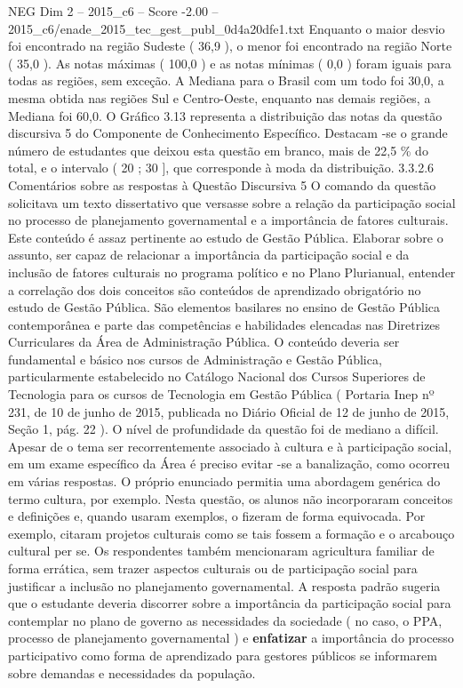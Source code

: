 \begin{textsample}{NEG Dim 2 – 2015\_c6 – Score -2.00 – 2015\_c6/enade\_2015\_tec\_gest\_publ\_0d4a20dfe1.txt}
Enquanto o maior desvio foi encontrado na região Sudeste ( 36,9 ), o menor foi encontrado na região Norte ( 35,0 ).
As notas máximas ( 100,0 ) e as notas mínimas ( 0,0 ) foram iguais para todas as regiões, sem exceção.
A Mediana para o Brasil com um todo foi 30,0, a mesma obtida nas regiões Sul e Centro-Oeste, enquanto nas demais regiões, a Mediana foi 60,0.
O Gráfico 3.13 representa a distribuição das notas da questão discursiva 5 do Componente de Conhecimento Específico.
Destacam -se o grande número de estudantes que deixou esta questão em branco, mais de 22,5 \% do total, e o intervalo ( 20 ; 30 ], que corresponde à moda da distribuição. 3.3.2.6 Comentários sobre as respostas à Questão Discursiva 5 O comando da questão solicitava um texto dissertativo que versasse sobre a relação da participação social no processo de planejamento governamental e a importância de fatores culturais.
Este conteúdo é assaz pertinente ao estudo de Gestão Pública.
Elaborar sobre o assunto, ser capaz de relacionar a importância da participação social e da inclusão de fatores culturais no programa político e no Plano Plurianual, entender a correlação dos dois conceitos são conteúdos de aprendizado obrigatório no estudo de Gestão Pública.
São elementos basilares no ensino de Gestão Pública contemporânea e parte das competências e habilidades elencadas nas Diretrizes Curriculares da Área de Administração Pública.
O conteúdo deveria ser fundamental e básico nos cursos de Administração e Gestão Pública, particularmente estabelecido no Catálogo Nacional dos Cursos Superiores de Tecnologia para os cursos de Tecnologia em Gestão Pública ( Portaria Inep nº 231, de 10 de junho de 2015, publicada no Diário Oficial de 12 de junho de 2015, Seção 1, pág. 22 ).
O nível de profundidade da questão foi de mediano a difícil.
Apesar de o tema ser recorrentemente associado à cultura e à participação social, em um exame específico da Área é preciso evitar -se a banalização, como ocorreu em várias respostas.
O próprio enunciado permitia uma abordagem genérica do termo cultura, por exemplo.
Nesta questão, os alunos não incorporaram conceitos e definições e, quando usaram exemplos, o fizeram de forma equivocada.
Por exemplo, citaram projetos culturais como se tais fossem a formação e o arcabouço cultural per se.
Os respondentes também mencionaram agricultura familiar de forma errática, sem trazer aspectos culturais ou de participação social para justificar a inclusão no planejamento governamental.
A resposta padrão sugeria que o estudante deveria discorrer sobre a importância da participação social para contemplar no plano de governo as necessidades da sociedade ( no caso, o PPA, processo de planejamento governamental ) e \textbf{enfatizar} a importância do processo participativo como forma de aprendizado para gestores públicos se informarem sobre demandas e necessidades da população.

\end{textsample}
